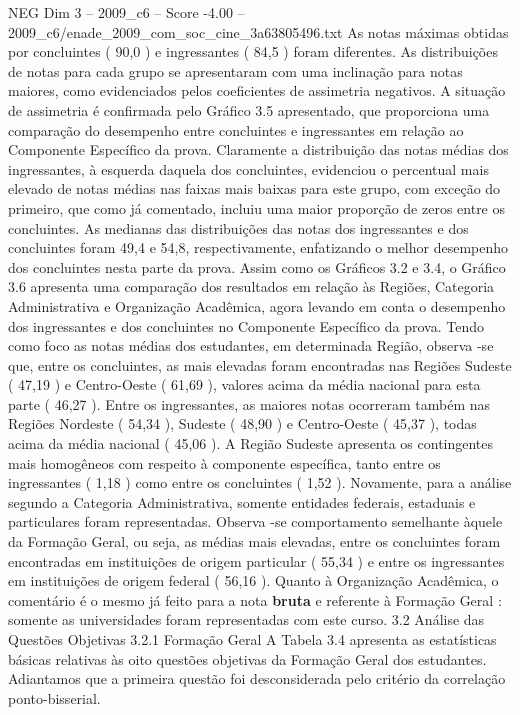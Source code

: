 \begin{textsample}{NEG Dim 3 – 2009\_c6 – Score -4.00 – 2009\_c6/enade\_2009\_com\_soc\_cine\_3a63805496.txt}
As notas máximas obtidas por concluintes ( 90,0 ) e ingressantes ( 84,5 ) foram diferentes.
As distribuições de notas para cada grupo se apresentaram com uma inclinação para notas maiores, como evidenciados pelos coeficientes de assimetria negativos.
A situação de assimetria é confirmada pelo Gráfico 3.5 apresentado, que proporciona uma comparação do desempenho entre concluintes e ingressantes em relação ao Componente Específico da prova.
Claramente a distribuição das notas médias dos ingressantes, à esquerda daquela dos concluintes, evidenciou o percentual mais elevado de notas médias nas faixas mais baixas para este grupo, com exceção do primeiro, que como já comentado, incluiu uma maior proporção de zeros entre os concluintes.
As medianas das distribuições das notas dos ingressantes e dos concluintes foram 49,4 e 54,8, respectivamente, enfatizando o melhor desempenho dos concluintes nesta parte da prova.
Assim como os Gráficos 3.2 e 3.4, o Gráfico 3.6 apresenta uma comparação dos resultados em relação às Regiões, Categoria Administrativa e Organização Acadêmica, agora levando em conta o desempenho dos ingressantes e dos concluintes no Componente Específico da prova.
Tendo como foco as notas médias dos estudantes, em determinada Região, observa -se que, entre os concluintes, as mais elevadas foram encontradas nas Regiões Sudeste ( 47,19 ) e Centro-Oeste ( 61,69 ), valores acima da média nacional para esta parte ( 46,27 ).
Entre os ingressantes, as maiores notas ocorreram também nas Regiões Nordeste ( 54,34 ), Sudeste ( 48,90 ) e Centro-Oeste ( 45,37 ), todas acima da média nacional ( 45,06 ).
A Região Sudeste apresenta os contingentes mais homogêneos com respeito à componente específica, tanto entre os ingressantes ( 1,18 ) como entre os concluintes ( 1,52 ).
Novamente, para a análise segundo a Categoria Administrativa, somente entidades federais, estaduais e particulares foram representadas.
Observa -se comportamento semelhante àquele da Formação Geral, ou seja, as médias mais elevadas, entre os concluintes foram encontradas em instituições de origem particular ( 55,34 ) e entre os ingressantes em instituições de origem federal ( 56,16 ).
Quanto à Organização Acadêmica, o comentário é o mesmo já feito para a nota \textbf{bruta} e referente à Formação Geral : somente as universidades foram representadas com este curso. 3.2 Análise das Questões Objetivas 3.2.1 Formação Geral A Tabela 3.4 apresenta as estatísticas básicas relativas às oito questões objetivas da Formação Geral dos estudantes.
Adiantamos que a primeira questão foi desconsiderada pelo critério da correlação ponto-bisserial.

\end{textsample}
